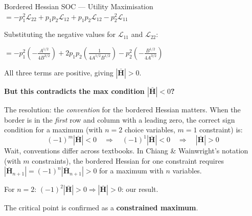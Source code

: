 \documentclass[12pt, a4paper]{article}
\theoremstyle{definition}
\newcommand{\bH}{\mathbf{H}}
\begin{document}
\begin{exbox}{Bordered Hessian SOC --- Utility Maximisation}
$= -p_1^2\mathcal{L}_{22} + p_1p_2\mathcal{L}_{12} + p_1p_2\mathcal{L}_{12}
   - p_2^2\mathcal{L}_{11}$

Substituting the negative values for $\mathcal{L}_{11}$ and $\mathcal{L}_{22}$:

$= -p_1^2\left(-\tfrac{A^{1/2}}{4B^{3/2}}\right)
   + 2p_1p_2\left(\tfrac{1}{4A^{1/2}B^{1/2}}\right)
   - p_2^2\left(-\tfrac{B^{1/2}}{4A^{3/2}}\right)$

All three terms are positive, giving $|\bar{\bH}| > 0$.

\textbf{But this contradicts the max condition $|\bar{\bH}|<0$?}

The resolution: the \emph{convention} for the bordered Hessian matters. When
the border is in the \emph{first} row and column with a leading zero, the
correct sign condition for a maximum (with $n=2$ choice variables,
$m=1$ constraint) is:
\[
  (-1)^m |\bar{\bH}| < 0 \quad \Rightarrow \quad (-1)^1 |\bar{\bH}| < 0
  \quad \Rightarrow \quad |\bar{\bH}| > 0
\]
Wait, conventions differ across textbooks. In Chiang \& Wainwright's notation
(with $m$ constraints), the bordered Hessian for one constraint requires
$|\bar{\bH}_{n+1}| = (-1)^n|\bar{\bH}_{n+1}|>0$ for a maximum with $n$
variables.

For $n=2$: $(-1)^2|\bar{\bH}|>0 \Rightarrow |\bar{\bH}|>0$: our result. \checkmark

The critical point is confirmed as a \textbf{constrained maximum}. \checkmark
\end{exbox}
\end{document}
